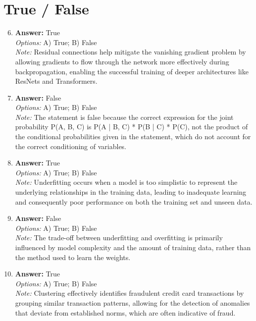 \documentclass[12pt]{article}
\begin{document}
\section*{True / False}
\begin{enumerate}[label=\arabic*.]
\setcounter{enumi}{5}
\item \textbf{Answer:} True
\\ \textit{Options:} A) True; B) False
\\ \textit{Note:} Residual connections help mitigate the vanishing gradient problem by allowing gradients to flow through the network more effectively during backpropagation, enabling the successful training of deeper architectures like ResNets and Transformers.
\item \textbf{Answer:} False
\\ \textit{Options:} A) True; B) False
\\ \textit{Note:} The statement is false because the correct expression for the joint probability P(A, B, C) is P(A | B, C) * P(B | C) * P(C), not the product of the conditional probabilities given in the statement, which do not account for the correct conditioning of variables.
\item \textbf{Answer:} True
\\ \textit{Options:} A) True; B) False
\\ \textit{Note:} Underfitting occurs when a model is too simplistic to represent the underlying relationships in the training data, leading to inadequate learning and consequently poor performance on both the training set and unseen data.
\item \textbf{Answer:} False
\\ \textit{Options:} A) True; B) False
\\ \textit{Note:} The trade-off between underfitting and overfitting is primarily influenced by model complexity and the amount of training data, rather than the method used to learn the weights.
\item \textbf{Answer:} True
\\ \textit{Options:} A) True; B) False
\\ \textit{Note:} Clustering effectively identifies fraudulent credit card transactions by grouping similar transaction patterns, allowing for the detection of anomalies that deviate from established norms, which are often indicative of fraud.
\end{enumerate}
\end{document}
